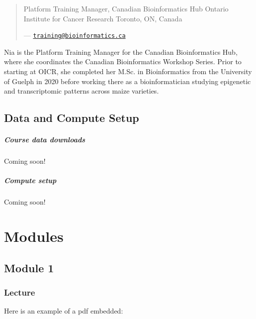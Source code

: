 \documentclass[
]{book}
\begin{document}
\begin{quote}
Platform Training Manager, Canadian Bioinformatics Hub
Ontario Institute for Cancer Research
Toronto, ON, Canada

--- \href{mailto:training@bioinformatics.ca}{\nolinkurl{training@bioinformatics.ca}}
\end{quote}

Nia is the Platform Training Manager for the Canadian Bioinformatics Hub, where she coordinates the Canadian Bioinformatics Workshop Series. Prior to starting at OICR, she completed her M.Sc. in Bioinformatics from the University of Guelph in 2020 before working there as a bioinformatician studying epigenetic and transcriptomic patterns across maize varieties.

\chapter{Data and Compute Setup}\label{data-and-compute-setup}

\subsubsection{Course data downloads}\label{course-data-downloads}

Coming soon!

\subsubsection{Compute setup}\label{compute-setup}

Coming soon!

\part{Modules}\label{part-modules}

\chapter{Module 1}\label{module-1}

\section{Lecture}\label{lecture}

Here is an example of a pdf embedded:
\end{document}
